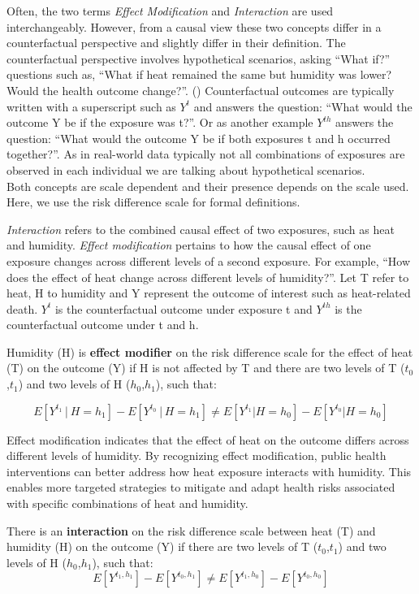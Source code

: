 \documentclass[
]{krantz}
\begin{document}
Often, the two terms \emph{Effect Modification} and \emph{Interaction} are used interchangeably. However, from a causal view these two concepts differ in a counterfactual perspective and slightly differ in their definition. The counterfactual perspective involves hypothetical scenarios, asking ``What if?'' questions such as, ``What if heat remained the same but humidity was lower? Would the health outcome change?''. (\citet{bours}) Counterfactual outcomes are typically written with a superscript such as \(Y^t\) and answers the question: ``What would the outcome Y be if the exposure was t?''. Or as another example \(Y^{th}\) answers the question: ``What would the outcome Y be if both exposures t and h occurred together?''. As in real-world data typically not all combinations of exposures are observed in each individual we are talking about hypothetical scenarios.\\
Both concepts are scale dependent and their presence depends on the scale used. Here, we use the risk difference scale for formal definitions.

\emph{Interaction} refers to the combined causal effect of two exposures, such as heat and humidity. \emph{Effect modification} pertains to how the causal effect of one exposure changes across different levels of a second exposure. For example, ``How does the effect of heat change across different levels of humidity?''.
Let T refer to heat, H to humidity and Y represent the outcome of interest such as heat-related death. \(Y^t\) is the counterfactual outcome under exposure t and \(Y^{th}\) is the counterfactual outcome under t and h.

Humidity (H) is \textbf{effect modifier} on the risk difference scale for the effect of heat (T) on the outcome (Y) if H is not affected by T and there are two levels of T (\(t_0\),\(t_1\)) and two levels of H (\(h_0\),\(h_1\)), such that:

\[
Ε[Y^{t_1}│H=h_1] - E[Y^{t_0}│H=h_1] ≠ E[Y^{t_1}|H=h_0]- E[Y^{t_0}|H=h_0]
\]

Effect modification indicates that the effect of heat on the outcome differs across different levels of humidity. By recognizing effect modification, public health interventions can better address how heat exposure interacts with humidity. This enables more targeted strategies to mitigate and adapt health risks associated with specific combinations of heat and humidity.

There is an \textbf{interaction} on the risk difference scale between heat (T) and humidity (H) on the outcome (Y) if there are two levels of T (\(t_0\),\(t_1\)) and two levels of H (\(h_0\),\(h_1\)), such that:
\[
Ε[Y^{t_1, h_1}] - E[Y^{t_0, h_1}] ≠ E[Y^{t_1, h_0}]- E[Y^{t_0, h_0}]
\]
\end{document}

